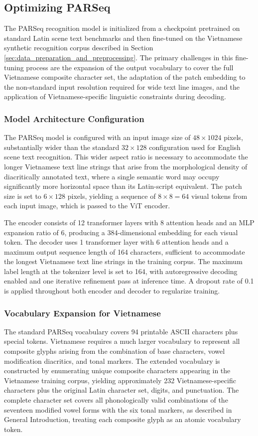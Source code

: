 \subsection{Optimizing PARSeq}
The PARSeq recognition model is initialized from a checkpoint pretrained on standard Latin scene text benchmarks and then fine-tuned on the Vietnamese synthetic recognition corpus described in Section \ref{sec:data_preparation_and_preprocessing}. The primary challenges in this fine-tuning process are the expansion of the output vocabulary to cover the full Vietnamese composite character set, the adaptation of the patch embedding to the non-standard input resolution required for wide text line images, and the application of Vietnamese-specific linguistic constraints during decoding.

\subsubsection{Model Architecture Configuration}
The PARSeq model is configured with an input image size of $48 \times 1024$ pixels, substantially wider than the standard $32 \times 128$ configuration used for English scene text recognition. This wider aspect ratio is necessary to accommodate the longer Vietnamese text line strings that arise from the morphological density of diacritically annotated text, where a single semantic word may occupy significantly more horizontal space than its Latin-script equivalent. The patch size is set to $6 \times 128$ pixels, yielding a sequence of $8 \times 8 = 64$ visual tokens from each input image, which is passed to the ViT encoder.

The encoder consists of 12 transformer layers with 8 attention heads and an MLP expansion ratio of 6, producing a 384-dimensional embedding for each visual token. The decoder uses 1 transformer layer with 6 attention heads and a maximum output sequence length of 164 characters, sufficient to accommodate the longest Vietnamese text line strings in the training corpus. The maximum label length at the tokenizer level is set to 164, with autoregressive decoding enabled and one iterative refinement pass at inference time. A dropout rate of 0.1 is applied throughout both encoder and decoder to regularize training.

\subsubsection{Vocabulary Expansion for Vietnamese}
The standard PARSeq vocabulary covers 94 printable ASCII characters plus special tokens. Vietnamese requires a much larger vocabulary to represent all composite glyphs arising from the combination of base characters, vowel modification diacritics, and tonal markers. The extended vocabulary is constructed by enumerating unique composite characters appearing in the Vietnamese training corpus, yielding approximately 232 Vietnamese-specific characters plus the original Latin character set, digits, and punctuation. The complete character set covers all phonologically valid combinations of the seventeen modified vowel forms with the six tonal markers, as described in General Introduction, treating each composite glyph as an atomic vocabulary token.

